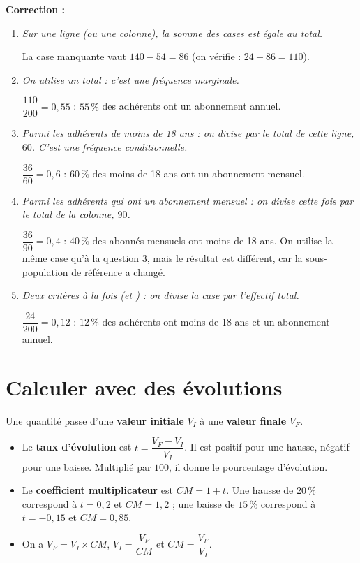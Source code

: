 \documentclass[10pt,a4paper]{article}
\begin{document}
\begin{bloc}
\textbf{Correction :}
\begin{enumerate}[leftmargin=*]
    \item \textit{Sur une ligne (ou une colonne), la somme des cases est égale au total.}

    La case manquante vaut \(140-54=86\) (on vérifie : \(24+86=110\)).
    \item \textit{On utilise un total : c'est une fréquence marginale.}

    \(\dfrac{110}{200}=0{,}55\) : \(55\,\%\) des adhérents ont un abonnement annuel.
    \item \textit{\og Parmi les adhérents de moins de 18 ans \fg{} : on divise par le total de cette ligne, \(60\). C'est une fréquence conditionnelle.}

    \(\dfrac{36}{60}=0{,}6\) : \(60\,\%\) des moins de 18 ans ont un abonnement mensuel.
    \item \textit{\og Parmi les adhérents qui ont un abonnement mensuel \fg{} : on divise cette fois par le total de la colonne, \(90\).}

    \(\dfrac{36}{90}=0{,}4\) : \(40\,\%\) des abonnés mensuels ont moins de 18 ans. On utilise la même case qu'à la question 3, mais le résultat est différent, car la sous-population de référence a changé.
    \item \textit{Deux critères à la fois (\og et \fg{}) : on divise la case par l'effectif total.}

    \(\dfrac{24}{200}=0{,}12\) : \(12\,\%\) des adhérents ont moins de 18 ans et un abonnement annuel.
\end{enumerate}
\end{bloc}

\section{Calculer avec des évolutions} \label{annexe-evolutions}

\begin{bloc}
\begin{defis}
Une quantité passe d'une \textbf{valeur initiale} \(V_I\) à une \textbf{valeur finale} \(V_F\).
\begin{itemize}
    \item Le \textbf{taux d'évolution} est \(t=\dfrac{V_F-V_I}{V_I}\). Il est positif pour une hausse, négatif pour une baisse. Multiplié par \(100\), il donne le pourcentage d'évolution.
    \item Le \textbf{coefficient multiplicateur} est \(CM=1+t\). Une hausse de \(20\,\%\) correspond à \(t=0{,}2\) et \(CM=1{,}2\) ; une baisse de \(15\,\%\) correspond à \(t=-0{,}15\) et \(CM=0{,}85\).
    \item On a \(V_F=V_I\times CM\), \quad \(V_I=\dfrac{V_F}{CM}\) \quad et \quad \(CM=\dfrac{V_F}{V_I}\).
\end{itemize}
\end{defis}
\end{bloc}
\end{document}
